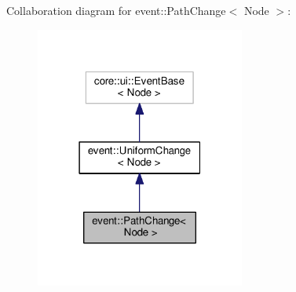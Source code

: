 Collaboration diagram for event\+:\+:Path\+Change$<$ Node $>$\+:\nopagebreak
\begin{figure}[H]
\begin{center}
\leavevmode
\includegraphics[width=195pt]{structevent_1_1PathChange__coll__graph}
\end{center}
\end{figure}
